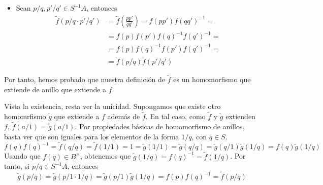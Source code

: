 \documentclass[twoside]{article}
\begin{document}
\begin{ejercicio}{1}
\begin{solucion}
\begin{itemize}
\begin{itemize}
\item Sean $p/q,p'/q' \in S^{-1}A$, entonces
\begin{align*}
\tilde{f}(p/q\cdot p'/q') &= 	\tilde{f}\left(\frac{pp'}{qq'}\right) = f(pp')f(qq')^{-1} = \\
 &= f(p)f(p')f(q)^{-1}f(q')^{-1} = \\
 &= f(p)f(q)^{-1}f(p')f(q')^{-1} =\\
 &= \tilde{f}(p/q)\tilde{f}(p'/q')
\end{align*}
\end{itemize}
Por tanto, hemos probado que nuestra definición de $\tilde{f}$ es un homomorfismo que extiende de anillo que extiende a $f$.
\end{itemize}
Vista la existencia, resta ver la unicidad. Supongamos que existe otro homomrfismo $\tilde{g}$ que extiende a $f$ además de $\tilde{f}$. En tal caso, como $\tilde{f}$ y $\tilde{g}$ extienden $f$, $\tilde{f}(a/1)=\tilde{g}(a/1)$. Por propiedades básicas de homomorfismo de anillos, basta ver que son iguales para los elementos de la forma $1/q$, con $q\in S$.
$$
f(q)f(q)^{-1} = \tilde{f}(q/q)= \tilde{f}(1/1) = 1 =\tilde{g}(1/1) =\tilde{g}(q/q) =\tilde{g}(q/1)\tilde{g}(1/q)=f(q)\tilde{g}(1/q)
$$
Usando que $f(q)\in B^\times$, obtenemos que $\tilde{g}(1/q)=f(q)^{-1}=\tilde{f}(1/q)$. Por tanto, si ${p/q\in S^{-1}A}$, entonces 
$$
\tilde{g}(p/q) = \tilde{g}(p/1\cdot 1/q) = \tilde{g}(p/1)\tilde{g}(1/q) = f(p)f(q)^{-1} = \tilde{f}(p/q)
$$

\end{solucion}
\end{ejercicio}
\end{document}
